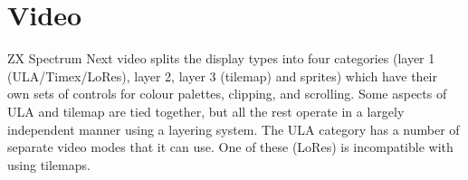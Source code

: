 \chapter{Video}
\begin{multicols}{2}
ZX Spectrum Next video splits the display types into four categories
(layer 1 (ULA/Timex/LoRes), layer 2, layer 3 (tilemap) and sprites)
which have their own sets of controls for colour palettes, clipping,
and scrolling. Some aspects of ULA and tilemap are tied together, but
all the rest operate in a largely independent manner using a layering
system. The ULA category has a number of separate video modes that it
can use. One of these (LoRes) is incompatible with using tilemaps.





\end{multicols}
